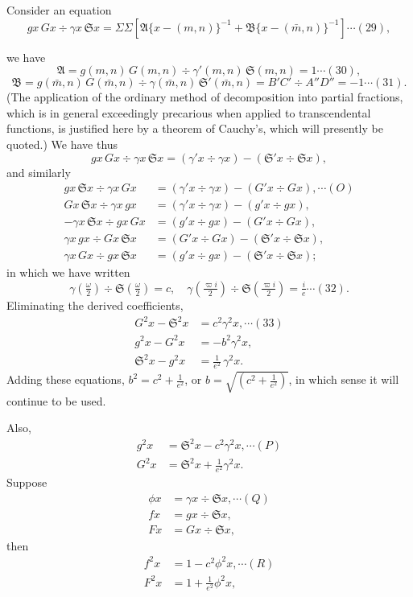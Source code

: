 \documentclass[12pt,a4paper]{article}
\newcommand{\fS}{\mathfrak{S}}
\newcommand{\fA}{\mathfrak{A}}
\newcommand{\fB}{\mathfrak{B}}
\newcommand{\mn}{(m,n)}
\newcommand{\mbn}{(\bar m,n)}
\begin{document}
Consider an equation
\[
g x\,G x \div \gamma x\,\fS x = \Sigma\Sigma\!\left[\fA\{x - \mn\}^{-1} + \fB\{x - \mbn\}^{-1}\right] \cdots(29),
\]

\newpage
\setcounter{page}{146}

we have
\[
\fA = g\mn\,G\mn \div \gamma'\mn\,\fS\mn = 1 \cdots(30),
\]
\[
\fB = g\mbn\,G\mbn \div \gamma\mbn\,\fS'\mbn = B'C' \div A''D'' = -1 \cdots(31).
\]
(The application of the ordinary method of decomposition into partial fractions, which is in general exceedingly precarious when applied to transcendental functions, is justified here by a theorem of Cauchy's, which will presently be quoted.) We have thus
\[
g x\,G x \div \gamma x\,\fS x = (\gamma' x \div \gamma x) - (\fS' x \div \fS x),
\]
and similarly
\begin{align*}
g x\,\fS x \div \gamma x\,G x &= (\gamma' x \div \gamma x) - (G' x \div G x), \cdots(O)\\
G x\,\fS x \div \gamma x\,g x &= (\gamma' x \div \gamma x) - (g' x \div g x),\\
-\gamma x\,\fS x \div g x\,G x &= (g' x \div g x) - (G' x \div G x),\\
\gamma x\,g x \div G x\,\fS x &= (G' x \div G x) - (\fS' x \div \fS x),\\
\gamma x\,G x \div g x\,\fS x &= (g' x \div g x) - (\fS' x \div \fS x);
\end{align*}
in which we have written
\[
\gamma\!\left(\tfrac{\omega}{2}\right)\!\div\!\fS\!\left(\tfrac{\omega}{2}\right) = c,\quad \gamma\!\left(\tfrac{\varpi i}{2}\right)\!\div\!\fS\!\left(\tfrac{\varpi i}{2}\right) = \tfrac{i}{e} \cdots(32).
\]
Eliminating the derived coefficients,
\begin{align*}
G^2 x - \fS^2 x &= c^2 \gamma^2 x, \cdots(33)\\
g^2 x - G^2 x &= -b^2 \gamma^2 x,\\
\fS^2 x - g^2 x &= \tfrac{1}{e^2}\,\gamma^2 x.
\end{align*}
Adding these equations, $b^2 = c^2 + \tfrac{1}{e^2}$, or $b = \sqrt{(c^2 + \tfrac{1}{e^2})}$, in which sense it will continue to be used.

Also,
\begin{align*}
g^2 x &= \fS^2 x - c^2 \gamma^2 x, \cdots(P)\\
G^2 x &= \fS^2 x + \tfrac{1}{e^2}\gamma^2 x.
\end{align*}
Suppose
\begin{align*}
\phi x &= \gamma x \div \fS x, \cdots(Q)\\
f x &= g x \div \fS x,\\
F x &= G x \div \fS x,
\end{align*}
then
\begin{align*}
f^2 x &= 1 - c^2 \phi^2 x, \cdots(R)\\
F^2 x &= 1 + \tfrac{1}{e^2}\phi^2 x,
\end{align*}
\end{document}
